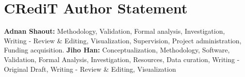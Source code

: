 \section*{CRediT Author Statement}
\textbf{Adnan Shaout:} Methodology,  Validation, Formal analysis, Investigation, Writing - Review \& Editing, Visualization, Supervision, Project administration, Funding acquisition. \textbf{Jiho Han:} Conceptualization, Methodology, Software, Validation, Formal Analysis, Investigation, Resources, Data curation, Writing - Original Draft, Writing - Review \& Editing, Visualization
\vfill